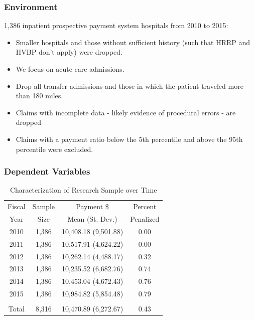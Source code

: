 \documentclass[ucs,9pt]{beamer}
\begin{document}
\begin{frame}
\frametitle{Environment}
1,386 inpatient prospective payment system hospitals from 2010 to 2015:
\begin{itemize}
\item Smaller hospitals and those without sufficient history (such that HRRP and HVBP don't apply) were dropped.
\item We focus on acute care admissions.
\item Drop all transfer admissions and those in which the patient traveled more than 180 miles.  
\item Claims with incomplete data - likely evidence of procedural errors - are dropped
\item Claims with a payment ratio below the 5th percentile and above the 95th percentile were excluded.
\end{itemize}
\end{frame}

\begin{frame}
\frametitle{Dependent Variables}

\begin{table}[htp]
\centering \normalsize
\caption{Characterization of Research Sample over Time}
\label{tab:samplemort}
\begin{tabular}{cccc}
\hline \hline
Fiscal & Sample 		&  Payment $\$$			& Percent \\
Year   &  Size    		&  Mean (St. Dev.) 			& Penalized \\
 \hline
2010 &      1,386		& 	10,408.18   (9,501.88)	& 0.00  \\
2011 &      1,386		& 	10,517.91   (4,624.22)	& 0.00   \\
2012 & 	1,386 		& 	10,262.14   (4,488.17) 	& 0.32   \\
2013 & 	1,386		& 	10,235.52   (6,682.76)	& 0.74  \\
2014 & 	1,386		&	10,453.04   (4,672.43)	& 0.76 \\
2015 &     1,386		& 	10,984.82   (5,854.48)	& 0.79 \\
&&&\\
\hline
Total & 	8,316		& 10,470.89   (6,272.67)	&	 0.43 \\
\hline
\end{tabular}
\end{table}
\end{frame}
\end{document}
